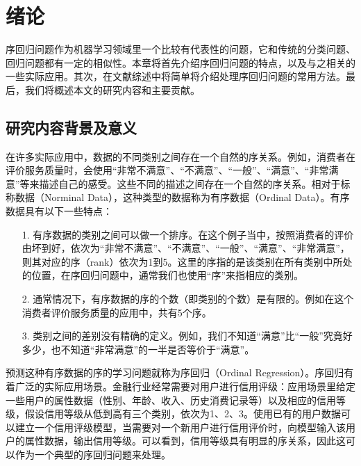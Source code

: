 
\chapter{绪论}
\label{chap:introduction}

序回归问题作为机器学习领域里一个比较有代表性的问题，它和传统的分类问题、回归问题都有一定的相似性。本章将首先介绍序回归问题的特点，以及与之相关的一些实际应用。其次，在文献综述中将简单将介绍处理序回归问题的常用方法。最后，我们将概述本文的研究内容和主要贡献。

\section{研究内容背景及意义}
\label{intro_back}
在许多实际应用中，数据的不同类别之间存在一个自然的序关系。例如，消费者在评价服务质量时，会使用“非常不满意”、“不满意”、“一般”、“满意”、“非常满意”等来描述自己的感受。这些不同的描述之间存在一个自然的序关系。相对于标称数据（Norminal Data），这种类型的数据称为有序数据（Ordinal Data）。有序数据具有以下一些特点：
\begin{enumerate}
\item[1.] 有序数据的类别之间可以做一个排序。在这个例子当中，按照消费者的评价由坏到好，依次为“非常不满意”、“不满意”、“一般”、“满意”、“非常满意”，则其对应的序（rank）依次为1到5。这里的序指的是该类别在所有类别中所处的位置，在序回归问题中，通常我们也使用“序”来指相应的类别。
\item[2.] 通常情况下，有序数据的序的个数（即类别的个数）是有限的。例如在这个消费者评价服务质量的应用中，共有5个序。
\item[3.] 类别之间的差别没有精确的定义。例如，我们不知道“满意”比“一般”究竟好多少，也不知道“非常满意”的一半是否等价于“满意”。
\end{enumerate}
预测这种有序数据的序的学习问题就称为序回归（Ordinal Regression）。序回归有着广泛的实际应用场景。金融行业经常需要对用户进行信用评级：应用场景里给定一些用户的属性数据（性别、年龄、收入、历史消费记录等）以及相应的信用等级，假设信用等级从低到高有三个类别，依次为1、2、3。使用已有的用户数据可以建立一个信用评级模型，当需要对一个新用户进行信用评价时，向模型输入该用户的属性数据，输出信用等级。可以看到，信用等级具有明显的序关系，因此这可以作为一个典型的序回归问题来处理\citep{kwon1997ordinal}\citep{kim2012corporate}\citep{dikkers2005support}\citep{fernandez2013addressing}。
